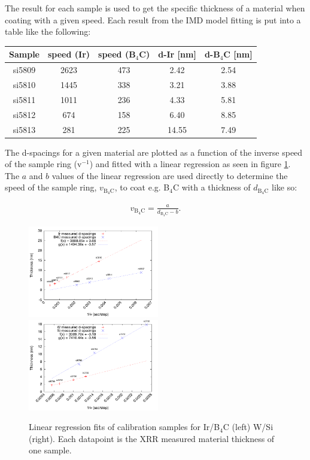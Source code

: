 The result for each sample is used to get the specific thickness of a material when coating with a given speed. Each result from the IMD model fitting is put into a table like the following:

\begin{center}
\begin{tabular}{c|c|c|c|c}
Sample & speed (Ir) & speed (B$_4$C) & d-Ir [nm] & d-B$_4$C [nm] \\
\hline
si5809 & 2623 & 473 & 2.42 & 2.54 \\
si5810 & 1445 & 338 & 3.21 & 3.88 \\
si5811 & 1011 & 236 & 4.33 & 5.81 \\
si5812 &  674 & 158 & 6.40 & 8.85 \\
si5813 & 281 & 225 & 14.55 & 7.49
\end{tabular}
\end{center}

The d-spacings for a given material are plotted as a function of the inverse speed of the sample ring (v$^{-1}$) and fitted with a linear regression as seen in figure \ref{fig:calib-fit}. The $a$ and $b$ values of the linear regression are used directly to determine the speed of the sample ring, $v_{\mathrm{B}_4\mathrm{C}}$, to coat e.g. B$_4$C with a thickness of $d_{\mathrm{B}_4\mathrm{C}}$ like so:

\begin{eqnarray}
	v_{\mathrm{B}_4\mathrm{C}} = \frac{a}{d_{\mathrm{B}_4\mathrm{C}}-b}.
\end{eqnarray}

\begin{figure}[!h]
	\center
	\includegraphics[height=4cm]{figures/chamber/calibration_plot-ir-b4c.pdf}
	\includegraphics[height=4cm]{figures/chamber/calibration_plot-w-si.pdf}
\caption{\footnotesize Linear regression fits of calibration samples for Ir/B$_4$C (left) W/Si (right). Each datapoint is the XRR measured material thickness of one sample.}\label{fig:calib-fit}
\end{figure}
